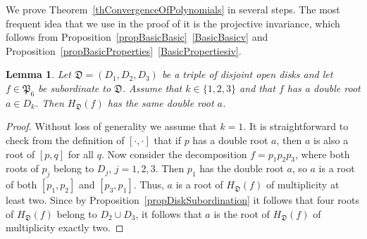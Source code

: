 \documentclass{amsart}
\numberwithin{equation}{section}
\newtheorem{lemma}[theorem]{Lemma}
\theoremstyle{definition}
\theoremstyle{remark}
\begin{document}
	We prove Theorem~\ref{thConvergenceOfPolynomials} in several steps. The most frequent idea that we use in the proof of it is the projective invariance, which follows from Proposition~\ref{propBasicBasic}~\ref{BasicBasicv} and Proposition~\ref{propBasicProperties}~\ref{BasicPropertiesiv}.
	
	\begin{lemma}\label{lemStationaryIfDouble}
		Let $\mathfrak D = (D_1, D_2, D_3)$ be a triple of disjoint open disks and let $f \in \mathfrak P_6$ be subordinate to $\mathfrak D$. Assume that $k \in \{1,2,3\}$ and that $f$ has a double root $a \in D_k$. Then $H_{\mathfrak D}(f)$ has the same double root $a$.
	\end{lemma}
	\begin{proof}
		Without loss of generality we assume that $k = 1$. It is straightforward to check from the definition of $[\cdot,\cdot]$ that if $p$ has a double root $a$, then $a$ is also a root of $[p,q]$ for all $q$. Now consider the decomposition $f = p_1p_2p_3$, where both roots of $p_j$ belong to $D_j$, $j = 1,2,3$. Then $p_1$ has the double root $a$, so $a$ is a root of both $[p_1, p_2]$ and $[p_3,p_1]$. Thus, $a$ is a root of $H_{\mathfrak D}(f)$ of multiplicity at least two. Since by Proposition~\ref{propDiskSubordination} it follows that four roots of $H_{\mathfrak D}(f)$ belong to $D_2 \cup D_3$, it follows that $a$ is the root of $H_{\mathfrak D}(f)$ of multiplicity exactly two.
	\end{proof}
	
\end{document}
